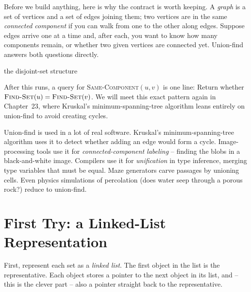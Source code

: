 Before we build anything, here is why the contract is worth keeping. A
\emph{graph} is a set of vertices and a set of edges joining them; two vertices
are in the same \emph{connected component} if you can walk from one to the
other along edges. Suppose edges arrive one at a time and, after each, you want
to know how many components remain, or whether two given vertices are connected
yet. Union-find answers both questions directly.

\begin{algorithm}[H]
\caption{\textsc{Connected-Components}$(G)$}
\Return the disjoint-set structure\;
\end{algorithm}

After this runs, a query for \textsc{Same-Component}$(u,v)$ is one line:
Return whether $\textsc{Find-Set}(u) = \textsc{Find-Set}(v)$. We will meet this
exact pattern again in Chapter~23, where Kruskal's minimum-spanning-tree
algorithm leans entirely on union-find to avoid creating cycles.

\begin{aestheticbox}
Union-find is used in a lot of real software. Kruskal's
minimum-spanning-tree algorithm uses it to detect whether adding an edge would
form a cycle. Image-processing tools use it for \emph{connected-component
labeling} -- finding the blobs in a black-and-white image. Compilers use it for
\emph{unification} in type inference, merging type variables that must be
equal. Maze generators carve passages by unioning cells. Even physics
simulations of percolation (does water seep through a porous rock?) reduce to
union-find.
\end{aestheticbox}

\section{First Try: a Linked-List Representation}
\label{ch19:linkedlist}

First, represent each set as a \emph{linked list}. The first
object in the list is the representative. Each object stores a pointer to the
next object in its list, and -- this is the clever part -- also a pointer
straight back to the representative.

